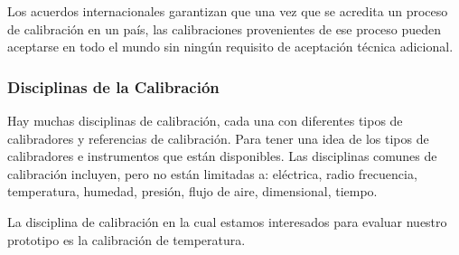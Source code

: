 \par \noindent
Los acuerdos internacionales garantizan que una vez que se acredita un proceso de calibración en un país, las calibraciones provenientes de ese proceso pueden aceptarse en todo el mundo sin ningún requisito de aceptación técnica adicional.

\subsubsection{Disciplinas de la Calibración \cite{calibracion-fluke}}

\par 
Hay muchas disciplinas de calibración, cada una con diferentes tipos de calibradores y referencias de calibración. Para tener una idea de los tipos de calibradores e instrumentos que están disponibles. Las disciplinas comunes de calibración incluyen, pero no están limitadas a: eléctrica, radio frecuencia, temperatura, humedad, presión, flujo de aire, dimensional, tiempo.

\par \noindent
La disciplina de calibración en la cual estamos interesados para evaluar nuestro prototipo es la calibración de temperatura.
